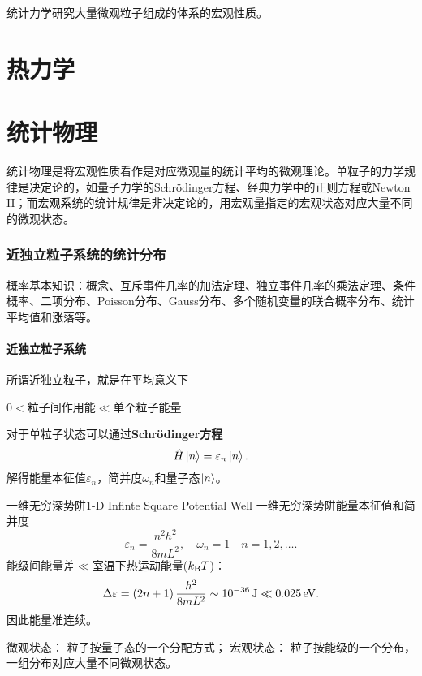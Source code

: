 \def\coursename{统计力学}
\def\coursefullname{统计力学}
\def\courseEnglishname{Statistical Mechanics}
\def\teachername{倪军}
\def\beginday{2022/3/25}
\def\endday{2022/6/16}




\let\oldO\O
\newcommand{\Om}[1][\,\!]{\Omega_{\mathrm{#1}}\!\hkh{a_i}}
\newcommand*{\Omm}{\Omega\!\hkh{a_\mathrm m}}
\newcommand*{\tl}{\mathrm t}					%
\newcommand*{\rt}{\mathrm r}					%
\newcommand*{\vb}{\mathrm v}					%
\newcommand*{\tv}{\mathrm t}					%
\newcommand*{\lt}{\mathrm l}					%
\newcommand*{\Db}{\mathrm D}
\newcommand*{\Fm}{\mathrm F}
\newcommand*{\Cr}{\mathrm C}
\newcommand*{\rs}{\mathrm r}
\newcommand*{\st}{\mathrm s}
\newcommand*{\df}{\mathrm d}
\newcommand*{\cll}{\mathrm c}

\DeclareMathOperator{\Debye}{D}
\DeclareMathOperator{\Brill}{B}
\DeclareMathOperator{\Einst}{E}


\firstandforemost

统计力学研究大量微观粒子组成的体系的宏观性质。
\part{热力学}


\clearpage
\part{统计物理}
统计物理是将宏观性质看作是对应微观量的统计平均的微观理论。单粒子的力学规律是决定论的，如量子力学的Schrödinger方程、经典力学中的正则方程或Newton II；而宏观系统的统计规律是非决定论的，用宏观量指定的宏观状态对应大量不同的微观状态。
\section{近独立粒子系统的统计分布}
概率基本知识：概念、互斥事件几率的加法定理、独立事件几率的乘法定理、条件概率、二项分布、Poisson分布、Gauss分布、多个随机变量的联合概率分布、统计平均值和涨落等。
\subsection{近独立粒子系统}
所谓近独立粒子，就是在平均意义下
\begin{center}
	$0<$粒子间作用能$\ll$单个粒子能量
\end{center}
对于单粒子状态可以通过\textbf{Schrödinger方程}
\[
	\hat H\left\vert n\right\rangle=\varepsilon_n\left\vert n\right\rangle.
\]
解得能量本征值$\varepsilon_n$，简并度$\omega_n$和量子态$\left\vert n\right\rangle$。
\begin{example}{一维无穷深势阱}{1-D Infinte Square Potential Well}
	一维无穷深势阱能量本征值和简并度
	\[
		\varepsilon_n=\frac{n^2h^2}{8mL^2},\quad\omega_n=1\quad n=1,2,\ldots.
	\]
	能级间能量差$\ll$室温下热运动能量($k_{\mathrm B} T$)：
	\[
		\Delta\varepsilon=\left(2n+1\right)\frac{h^2}{8mL^2}\sim\SI{e-36}\joule\ll\SI{0.025}\electronvolt.
	\]
	因此能量准连续。
\end{example}
微观状态：
粒子按量子态的一个分配方式；
宏观状态：
粒子按能级的一个分布，%
一组分布对应大量不同微观状态。

